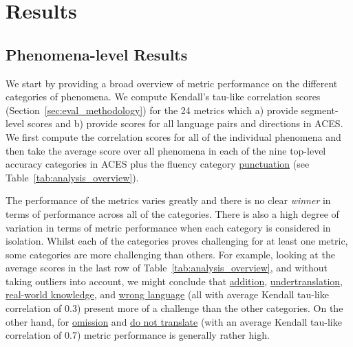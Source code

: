 \documentclass[11pt]{article}
\begin{document}
\section{Results}
\label{sec: Results}


\subsection{Phenomena-level Results}
We start by providing a broad overview of metric performance on the different categories of phenomena. We compute Kendall's tau-like correlation scores (Section~\ref{sec:eval_methodology}) for the 24 metrics which a) provide segment-level scores and b) provide scores for all language pairs and directions in \textsc{ACES}. We first compute the correlation scores for all of the individual phenomena and then take the average score over all phenomena in each of the nine top-level accuracy categories in \textsc{ACES} plus the fluency category \hyperref[sec:punctuation]{punctuation} (see Table~\ref{tab:analysis_overview}).

The performance of the metrics varies greatly and there is no clear \textit{winner} in terms of performance across all of the categories. There is also a high degree of variation in terms of metric performance when each category is considered in isolation. Whilst each of the categories proves challenging for at least one metric, some categories are more challenging than others. For example, looking at the average scores in the last row of Table~\ref{tab:analysis_overview}, and without taking outliers into account, we might conclude that \hyperref[sec:addition-omission]{addition}, \hyperref[sec:overtranslation_undertranslation]{undertranslation}, \hyperref[sec:real-world-knowledge]{real-world knowledge}, and \hyperref[sec:wrong_language]{wrong language} (all with average Kendall tau-like correlation of  0.3) present more of a challenge than the other categories. On the other hand, for \hyperref[sec:addition-omission]{omission} and \hyperref[sec:do-not-translate]{do not translate} (with an average Kendall tau-like correlation of  0.7) metric performance is generally rather high. 
\end{document}
